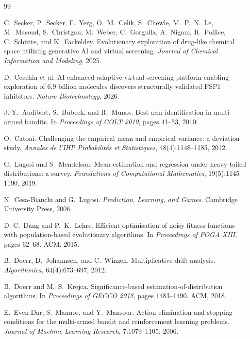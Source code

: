 \documentclass[11pt,a4paper]{article}
\begin{document}
\begin{thebibliography}{99}

C.~Secker, P.~Secker, F.~Yerg, O.~M.~Celik, S.~Chewle, M.~P.~N.~Le,
M.~Masoud, S.~Christgau, M.~Weber, C.~Gorgulla, A.~Nigam, R.~Pollice,
C.~Sch\"utte, and K.~Fackeldey.
Evolutionary exploration of drug-like chemical space utilizing generative AI
and virtual screening.
\textit{Journal of Chemical Information and Modeling}, 2025.

D.~Cecchin et al.
AI-enhanced adaptive virtual screening platform enabling exploration of 6.9
billion molecules discovers structurally validated FSP1 inhibitors.
\textit{Nature Biotechnology}, 2026.

J.-Y.~Audibert, S.~Bubeck, and R.~Munos.
Best arm identification in multi-armed bandits.
In \textit{Proceedings of COLT 2010}, pages 41--53, 2010.

O.~Catoni.
Challenging the empirical mean and empirical variance: a deviation study.
\textit{Annales de l'IHP Probabilit\'es et Statistiques}, 48(4):1148--1185, 2012.

G.~Lugosi and S.~Mendelson.
Mean estimation and regression under heavy-tailed distributions: a survey.
\textit{Foundations of Computational Mathematics}, 19(5):1145--1190, 2019.

N.~Cesa-Bianchi and G.~Lugosi.
\textit{Prediction, Learning, and Games}.
Cambridge University Press, 2006.

D.-C.~Dang and P.~K.~Lehre.
Efficient optimisation of noisy fitness functions with population-based
evolutionary algorithms.
In \textit{Proceedings of FOGA XIII}, pages 62--68. ACM, 2015.

B.~Doerr, D.~Johannsen, and C.~Winzen.
Multiplicative drift analysis.
\textit{Algorithmica}, 64(4):673--697, 2012.

B.~Doerr and M.~S.~Krejca.
Significance-based estimation-of-distribution algorithms.
In \textit{Proceedings of GECCO 2018}, pages 1483--1490. ACM, 2018.

E.~Even-Dar, S.~Mannor, and Y.~Mansour.
Action elimination and stopping conditions for the multi-armed bandit and
reinforcement learning problems.
\textit{Journal of Machine Learning Research}, 7:1079--1105, 2006.


\end{thebibliography}
\end{document}
